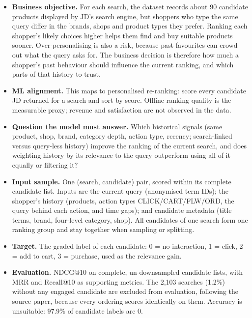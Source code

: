 \documentclass[11pt,a4paper]{article}
\begin{document}
\begin{itemize}
\item \textbf{Business objective.} For each search, the dataset records about 90 candidate products displayed by JD's search engine, but shoppers who type the same query differ in the brands, shops and product types they prefer. Ranking each shopper's likely choices higher helps them find and buy suitable products sooner. Over-personalising is also a risk, because past favourites can crowd out what the query asks for. The business decision is therefore how much a shopper's past behaviour should influence the current ranking, and which parts of that history to trust.

\item \textbf{ML alignment.} This maps to personalised re-ranking: score every candidate JD returned for a search and sort by score. Offline ranking quality is the measurable proxy; revenue and satisfaction are not observed in the data.

\item \textbf{Question the model must answer.} Which historical signals (same product, shop, brand, category depth, action type, recency; search-linked versus query-less history) improve the ranking of the current search, and does weighting history by its relevance to the query outperform using all of it equally or filtering it?

\item \textbf{Input sample.} One (search, candidate) pair, scored within its complete candidate list. Inputs are the current query (anonymised term IDs); the shopper's history (products, action types CLICK/CART/FLW/ORD, the query behind each action, and time gaps); and candidate metadata (title terms, brand, four-level category, shop). All candidates of one search form one ranking group and stay together when sampling or splitting.

\item \textbf{Target.} The graded label of each candidate: 0 = no interaction, 1 = click, 2 = add to cart, 3 = purchase, used as the relevance gain.

\item \textbf{Evaluation.} NDCG@10 on complete, un-downsampled candidate lists, with MRR and Recall@10 as supporting metrics. The 2,103 searches (1.2\%) without any engaged candidate are excluded from evaluation, following the source paper, because every ordering scores identically on them. Accuracy is unsuitable: 97.9\% of candidate labels are 0.
\end{itemize}
\end{document}
